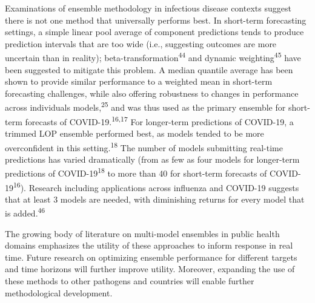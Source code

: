 \documentclass[
]{article}
\begin{document}
Examinations of ensemble methodology in infectious disease contexts
suggest there is not one method that universally performs best. In
short-term forecasting settings, a simple linear pool average of
component predictions tends to produce prediction intervals that are too
wide (i.e., suggesting outcomes are more uncertain than in reality);
beta-transformation\textsuperscript{44} and dynamic
weighting\textsuperscript{45} have been suggested to mitigate this
problem. A median quantile average has been shown to provide similar
performance to a weighted mean in short-term forecasting challenges,
while also offering robustness to changes in performance across
individuals models,\textsuperscript{25} and was thus used as the primary
ensemble for short-term forecasts of COVID-19.\textsuperscript{16,17}
For longer-term predictions of COVID-19, a trimmed LOP ensemble
performed best, as models tended to be more overconfident in this
setting.\textsuperscript{18} The number of models submitting real-time
predictions has varied dramatically (from as few as four models for
longer-term predictions of COVID-19\textsuperscript{18} to more than 40
for short-term forecasts of COVID-19\textsuperscript{16}). Research
including applications across influenza and COVID-19 suggests that at
least 3 models are needed, with diminishing returns for every model that
is added.\textsuperscript{46}

The growing body of literature on multi-model ensembles in public health
domains emphasizes the utility of these approaches to inform response in
real time. Future research on optimizing ensemble performance for
different targets and time horizons will further improve utility.
Moreover, expanding the use of these methods to other pathogens and
countries will enable further methodological development.
\end{document}
